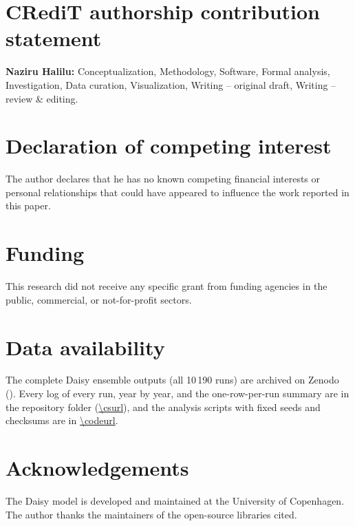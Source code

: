 \documentclass[review,12pt,authoryear]{elsarticle}
\begin{document}
\section*{CRediT authorship contribution statement}
\textbf{Naziru Halilu:} Conceptualization, Methodology, Software, Formal analysis, Investigation, Data curation, Visualization, Writing -- original draft, Writing -- review \& editing.

\section*{Declaration of competing interest}
The author declares that he has no known competing financial interests or personal relationships that could have appeared to influence the work reported in this paper.

\section*{Funding}
This research did not receive any specific grant from funding agencies in the public, commercial, or not-for-profit sectors.

\section*{Data availability}
The complete Daisy ensemble outputs (all 10\,190 runs) are archived on Zenodo (). Every log of every run, year by year, and the one-row-per-run summary are in the repository folder \cslink{} (\url{\csurl}), and the analysis scripts with fixed seeds and checksums are in \url{\codeurl}.

\section*{Acknowledgements}
The Daisy model is developed and maintained at the University of Copenhagen. The author thanks the maintainers of the open-source libraries cited.

\appendix
\end{document}
